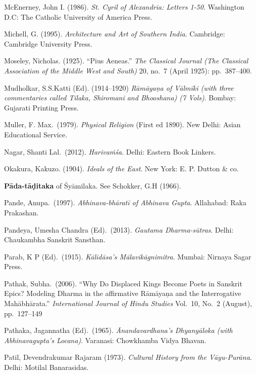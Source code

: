 \begin{thebibliography}{99}
McEnerney, John I. (1986). {\sl St. Cyril of Alexandria: Letters 1-50}. Washington D.C: The Catholic University of America Press. 

Michell, G. (1995). {\sl Architecture and Art of Southern India}. Cambridge: Cambridge University Press.

Moseley, Nicholas. (1925). “Pius Aeneas.” {\sl The Classical Journal (The Classical Association of the Middle West and South)} 20, no.~7 (April 1925): pp.~387--400.

Mudholkar, S.S.Katti (Ed). (1914--1920) {\sl Rāmāyaṇa of Vālmīki (with three commentaries called Tilaka,    Shiromani and Bhooshana) (7 Vols)}. Bombay: Gujarati Printing Press. 

Muller, F. Max.\ (1979). {\sl Physical Religion} (First ed 1890). New Delhi: Asian Educational Service. 

Nagar, Shanti Lal.\ (2012). {\sl Harivaṁśa}. Delhi: Eastern Book Linkers. 

Okakura, Kakuzo. (1904). {\sl Ideals of the East}. New York: E. P. Dutton \& co. 

{\bf Pāda-tāḍitaka} of Śyāmilaka. See Schokker, G.H (1966).

Pande, Anupa.\ (1997). {\sl Abhinava-bhāratī of Abhinava Gupta}. Allahabad: Raka Prakashan. 

Pandeya, Umesha Chandra (Ed).\ (2013). {\sl Gautama Dharma-sūtras}. Delhi: Chaukambha Sanskrit Sansthan. 

Parab, K P (Ed).\ (1915). {\sl Kālidāsa’s Mālavikāgnimitra}. Mumbai: Nirnaya Sagar Press. 

Pathak, Subha.\ (2006). “Why Do Displaced Kings Become Poets in Sanskrit Epics? Modeling Dharma in the affirmative Rāmāyaṇa and the Interrogative Mahābhārata.” {\sl International Journal of Hindu Studies} Vol.~10, No.~2 (August), pp.~127--149

Pathaka, Jagannatha (Ed).\ (1965). {\sl Ānandavardhana’s Dhyanyāloka (with Abhinavagupta’s Locana)}. Varanasi: Chowkhamba Vidya Bhavan. 

Patil, Devendrakumar Rajaram (1973). {\sl Cultural History from the Vāyu-Purāna}. Delhi: Motilal Banarasidas. 


\end{thebibliography}
